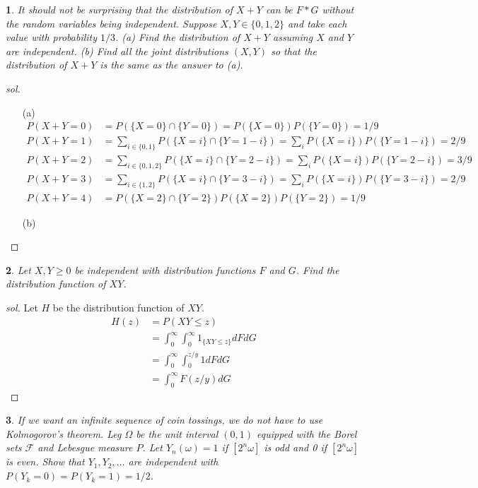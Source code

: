 \documentclass{report}
\newtheorem{ex}{}[section]
\begin{document}
\begin{ex}
It should not be surprising that the distribution of $X+Y$ can be $F*G$ without the random variables being independent. Suppose $X,Y \in \{0,1,2\}$ and take each value with probability $1/3$. (a) Find the distribution of $X+Y$ assuming $X$ and $Y$ are independent. (b) Find all the joint distributions $(X,Y)$ so that the distribution of $X+Y$ is the same as the answer to (a).
\end{ex}
\begin{proof}[sol]~
\begin{enumerate}
    \item[(a)] 
        \begin{align*}
        P(X+Y = 0) &= P(\{X = 0\}\cap\{Y = 0\}) =P(\{X = 0\})P(\{Y = 0\}) = 1/9\\
        P(X+Y = 1) &= \sum_{i\in\{0,1\}} P(\{X = i\}\cap\{Y = 1-i\})= \sum_i P(\{X = i\})P(\{Y = 1-i\}) = 2/9\\
        P(X+Y = 2) &= \sum_{i\in\{0,1,2\}} P(\{X = i\}\cap\{Y = 2-i\})= \sum_i P(\{X = i\})P(\{Y = 2-i\}) = 3/9\\
        P(X+Y = 3) &=\sum_{i\in\{1,2\}} P(\{X = i\}\cap\{Y = 3-i\})= \sum_i P(\{X = i\})P(\{Y = 3-i\}) = 2/9\\
        P(X+Y = 4) &= P(\{X = 2\}\cap\{Y = 2\}) P(\{X = 2\})P(\{Y = 2\}) = 1/9
        \end{align*}
    \item[(b)]
\end{enumerate}
\end{proof}
\begin{ex}
Let $X,Y \ge 0$ be independent with distribution functions $F$ and $G$. Find the distribution function of $XY$.
\end{ex}
\begin{proof}[sol]
Let $H$ be the distribution function of $XY$.
\begin{align*}
    H(z) &= P(XY \le z)\\
    &=\int_0^\infty\int_0^\infty 1_{\{XY \le z\}} dFdG\\
    &=\int_0^\infty\int_{0}^{z/y}1dFdG\\
    &=\int_0^\infty F(z/y)dG
\end{align*}

\end{proof}
\begin{ex}
If we want an infinite sequence of coin tossings, we do not have to use Kolmogorov's theorem. Leg $\Omega$ be the unit interval $(0,1)$ equipped with the Borel sets $\mathcal{F}$ and Lebesgue measure $P$. Let $Y_n(\omega) = 1$ if $[2^n\omega]$ is odd and 0 if $[2^n\omega]$ is even. Show that $Y_1,Y_2,...$ are independent with $P(Y_k = 0) = P(Y_k= 1) = 1/2$.
\end{ex}
\end{document}
